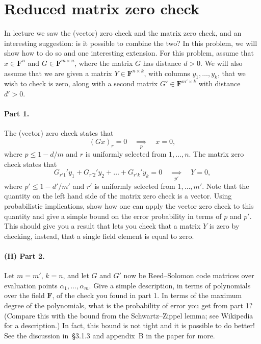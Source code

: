 \documentclass[12pt]{article}
\newcommand{\field}{\mathbf{F}}
\newcommand{\impliesn}[1]{\underset{#1}{\implies}}
\newcommand{\impliesp}{\impliesn{p}}
\newcommand{\impliespp}{\impliesn{p'}}
\begin{document}
\section{Reduced matrix zero check}
In lecture we saw the (vector) zero check and the matrix zero check, and an
interesting suggestion: is it possible to combine the two? In this problem, we
will show how to do so and one interesting extension. For this problem, assume
that $x \in \field^n$ and $G\in \field^{m\times n}$, where the matrix $G$ has
distance $d > 0$. We will also assume that we are given a matrix $Y\in
\field^{n \times k}$, with columns $y_1, \dots, y_k$, that we wish to check is
zero, along with a second matrix $G' \in \field^{m' \times k}$ with distance
$d' > 0$.

\paragraph{Part 1.} The (vector) zero check states that
\[
    (Gx)_r = 0 \quad \impliesp \quad x = 0,
\]
where $p \le 1 - d/m$ and $r$ is uniformly selected from $1, \dots, n$. The
matrix zero check states that
\[
    G_{r'1}'y_1 + G_{r'2}'y_2 + \dots + G_{r'k}'y_k = 0 \quad \impliespp \quad Y = 0,
\]
where $p' \le 1-d'/m'$ and $r'$ is uniformly selected from $1, \dots, m'$. Note
that the quantity on the left hand side of the matrix zero check is a vector.
Using probabilistic implications, show how one can apply the vector zero check
to this quantity and give a simple bound on the error probability in terms of
$p$ and $p'$. This should give you a result that lets you check that a matrix
$Y$ is zero by checking, instead, that a single field element is equal to zero.

\paragraph{(H) Part 2.} Let $m=m'$, $k=n$, and let $G$ and $G'$ now be
Reed--Solomon code matrices over evaluation points $\alpha_1, \dots, \alpha_m$.
Give a simple description, in terms of polynomials over the field $\field$, of
the check you found in part 1. In terms of the maximum degree of the
polynomials, what is the probability of error you get from part 1? (Compare
this with the bound from the Schwartz--Zippel lemma; see Wikipedia for a
description.) In fact, this bound is not tight and it is possible to do better!
See the discussion in~\S3.1.3 and appendix~B in the paper for more.
\end{document}
